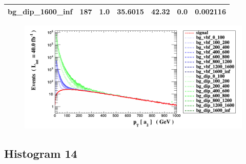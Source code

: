 \documentclass[a4paper, 10pt]{article}
\begin{document}
\begin{table}[H]
\begin{center}
\begin{tabular}{|m{23.0mm}|m{23.0mm}|m{18.0mm}|m{19.0mm}|m{19.0mm}|m{19.0mm}|m{19.0mm}|}
      \hline
      {\cellcolor{white}         bg\_dip\_1600\_inf}& {\cellcolor{white}         187}& {\cellcolor{white}         1.0}& {\cellcolor{white}         35.6015}& {\cellcolor{white}         42.32}& {\cellcolor{green}         0.0}& {\cellcolor{green}         0.002116}\\
\hline
    \end{tabular}
  \end{center}
\end{table}

\begin{figure}[H]
  \begin{center}
    \includegraphics[scale=0.45]{selection_12.png}\\
\caption{   }
  \end{center}
\end{figure}
      \newpage
\subsection{ Histogram 14}
\end{document}
